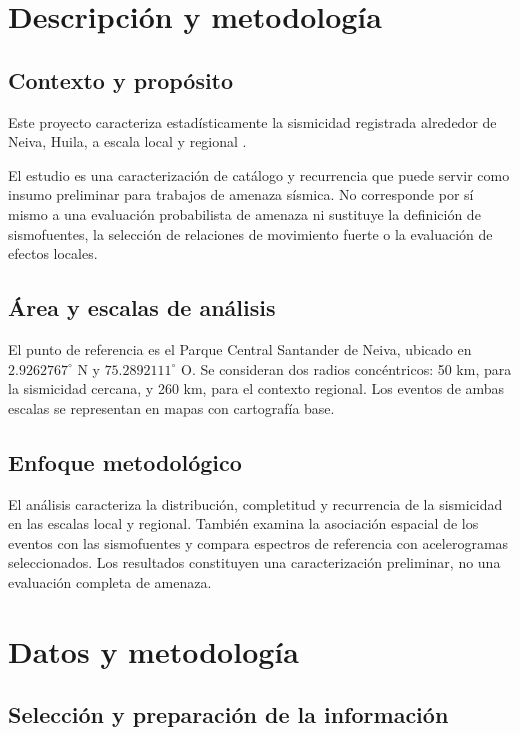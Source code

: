 \documentclass[12pt,oneside]{report}
\begin{document}
\chapter{Descripción y metodología}

\section{Contexto y propósito}

Este proyecto caracteriza estadísticamente la sismicidad registrada alrededor
de Neiva, Huila, a escala local y regional
\parencite{sgcCatalogoSismicidad,usgsComCat}.

El estudio es una caracterización de catálogo y recurrencia que puede servir
como insumo preliminar para trabajos de amenaza sísmica. No corresponde por sí
mismo a una evaluación probabilista de amenaza ni sustituye la definición de
sismofuentes, la selección de relaciones de movimiento fuerte o la evaluación
de efectos locales.

\section{Área y escalas de análisis}

El punto de referencia es el Parque Central Santander de Neiva, ubicado en
$2.9262767^\circ$ N y $75.2892111^\circ$ O. Se consideran dos radios
concéntricos: 50 km, para la sismicidad cercana, y 260 km, para el contexto
regional. Los eventos de ambas escalas se representan en mapas con cartografía
base.


\section{Enfoque metodológico}

El análisis caracteriza la distribución, completitud y recurrencia de la
sismicidad en las escalas local y regional. También examina la asociación
espacial de los eventos con las sismofuentes y compara espectros de referencia
con acelerogramas seleccionados. Los resultados constituyen una
caracterización preliminar, no una evaluación completa de amenaza.

\chapter{Datos y metodología}

\section{Selección y preparación de la información}
\end{document}
